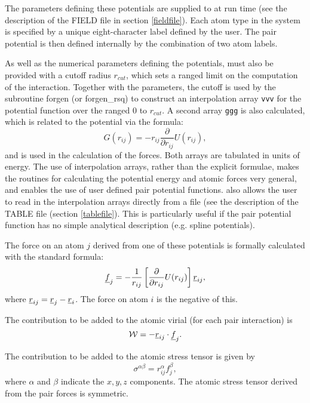 The parameters defining these potentials are supplied to
\D{} at run time (see the description of the FIELD file in section
\ref{fieldfile}). Each atom type in the system is specified by a unique
eight-character label defined by the user. The pair potential is then
defined internally by the combination of two atom labels.

As well as the numerical parameters defining the potentials,
\D{} must also be provided with a cutoff radius $r_{cut}$,
which sets a ranged limit on the computation of the interaction.
Together with the parameters, the cutoff is used by the subroutine
{\sc forgen} (or {\sc forgen\_rsq}) to construct an interpolation
array {\tt vvv} for the potential function over the ranged 0 to
$r_{cut}$. A second array {\tt ggg} is also calculated, which is
related to the potential via the formula:
\begin{equation}
G(r_{ij})=-r_{ij}\frac{\partial}{\partial r_{ij}}U(r_{ij}),
\end{equation}
and is used in the calculation of the forces. Both arrays are
tabulated in units of energy.  The use of interpolation arrays, rather
than the explicit formulae, makes the routines for calculating the
potential energy and atomic forces very general, and
enables the use of user defined pair potential functions.
\D{} also allows the user to read in the interpolation arrays
directly from a file (see the description of the TABLE file (section
\ref{tablefile}).  This is particularly useful if the pair potential
function has no simple analytical description (e.g.  spline
potentials).

The force on an atom $j$ derived from one of these potentials is
formally calculated with the standard formula:
\begin{equation}
\mbox{$\underline{f}$}_{j}=-\frac{1}{r_{ij}}\left[\frac{\partial}{\partial 
r_{ij}}U(r_{ij})\right]\mbox{$\underline{r}$}_{ij},
\end{equation}
where $\mbox{$\underline{r}$}_{ij}=\mbox{$\underline{r}$}_{j}-\mbox{$\underline{r}$}_{i}$. The force on atom $i$ is
the negative of this.

The contribution to be added to the atomic virial (for each pair
interaction) is
\begin{equation}
{\cal W}=-\mbox{$\underline{r}$}_{ij}\cdot\mbox{$\underline{f}$}_{j}.
\end{equation}

The contribution to be added to the atomic stress tensor is
given by
\begin{equation}
\sigma^{\alpha \beta}=r_{ij}^{\alpha}f_{j}^{\beta},
\end{equation}
where $\alpha$ and $\beta$ indicate the $x,y,z$ components. The atomic
stress tensor derived from the pair forces is symmetric.

